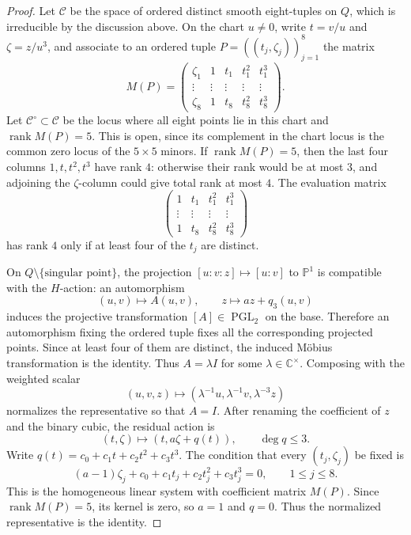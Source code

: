 \documentclass[11pt]{article}
\theoremstyle{plain}
\theoremstyle{definition}
\theoremstyle{remark}
\newcommand{\Pp}{\mathbb P}
\newcommand{\C}{\mathbb C}
\begin{document}
\begin{proof}
Let \(\mathcal C\) be the space of ordered distinct smooth eight-tuples on
\(Q\), which is irreducible by the discussion above. On the chart
\(u\ne0\), write \(t=v/u\) and \(\zeta=z/u^3\), and associate to an
ordered tuple \(P=((t_j,\zeta_j))_{j=1}^8\) the matrix
\[
M(P)=
\begin{pmatrix}
\zeta_1&1&t_1&t_1^2&t_1^3\\
\vdots&\vdots&\vdots&\vdots&\vdots\\
\zeta_8&1&t_8&t_8^2&t_8^3
\end{pmatrix}.
\]
Let \(\mathcal C^\circ\subset\mathcal C\) be the locus where all eight
points lie in this chart and \(\operatorname{rank}M(P)=5\). This is open,
since its complement in the chart locus is the common zero locus of the
\(5\times5\) minors. If \(\operatorname{rank}M(P)=5\), then the last four
columns \(1,t,t^2,t^3\) have rank \(4\): otherwise their rank would be at
most \(3\), and adjoining the \(\zeta\)-column could give total rank at
most \(4\). The evaluation matrix
\[
\begin{pmatrix}
1&t_1&t_1^2&t_1^3\\
\vdots&\vdots&\vdots&\vdots\\
1&t_8&t_8^2&t_8^3
\end{pmatrix}
\]
has rank \(4\) only if at least four of the \(t_j\) are distinct.

On \(Q\setminus\{\text{singular point}\}\), the projection
\([u:v:z]\mapsto[u:v]\) to \(\Pp^1\) is compatible with the \(H\)-action:
an automorphism
\[
(u,v)\longmapsto A(u,v),\qquad z\longmapsto az+q_3(u,v)
\]
induces the projective transformation \([A]\in\operatorname{PGL}_2\) on
the base. Therefore an automorphism fixing the ordered tuple fixes all the
corresponding projected points. Since at least four of them are distinct,
the induced M\"obius transformation is the identity. Thus
\(A=\lambda I\) for some \(\lambda\in\C^\times\). Composing with the
weighted scalar
\[
(u,v,z)\longmapsto
(\lambda^{-1}u,\lambda^{-1}v,\lambda^{-3}z)
\]
normalizes the representative so that \(A=I\). After renaming the
coefficient of \(z\) and the binary cubic, the residual action is
\[
(t,\zeta)\longmapsto(t,a\zeta+q(t)),\qquad \deg q\leq3.
\]
Write \(q(t)=c_0+c_1t+c_2t^2+c_3t^3\). The condition that every
\((t_j,\zeta_j)\) be fixed is
\[
(a-1)\zeta_j+c_0+c_1t_j+c_2t_j^2+c_3t_j^3=0,
\qquad 1\leq j\leq 8.
\]
This is the homogeneous linear system with coefficient matrix \(M(P)\).
Since \(\operatorname{rank}M(P)=5\), its kernel is zero, so \(a=1\) and
\(q=0\). Thus the normalized representative is the identity.


\end{proof}
\end{document}
